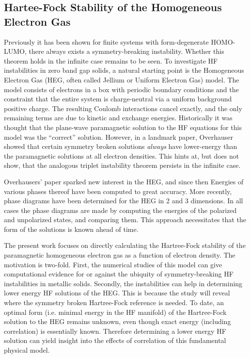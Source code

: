 \documentclass{revtex4}
\begin{document}
    \subsection{Hartee-Fock Stability of the Homogeneous Electron Gas}
    
    Previously it has been shown for finite systems with form-degenerate HOMO-LUMO, there always 
    exists a symmetry-breaking instability\cite{Yamada2015}. Whether this theorem holds in the 
    infinite case remains to be seen. To investigate HF instabilities in zero band gap solids, a 
    natural starting point is the Homogeneous Electron Gas (HEG, often called Jellium or Uniform 
    Electron Gas) model. The model consists of electrons in a box with periodic boundary conditions 
    and the constraint that the entire system is charge-neutral via a uniform background positive 
    charge. The resulting Coulomb interactions cancel exactly, and the only remaining terms are due 
    to kinetic and exchange energies. Historically it was thought that the 
    plane-wave paramagnetic solution to the HF equations for this model was the ``correct'' 
    solution. However, in a landmark paper, Overhauser showed that certain symmetry broken 
    solutions \emph{always} have lower-energy than the paramagnetic solutions at all electron 
    densities\cite{Overhauser1962}. This hints at, but does not show, that the analogous triplet 
    instability theorem persists in the infinite case.  
    
      Overhausers' paper sparked new interest in the HEG, and since then Energies of various 
      phases thereof 
      have been computed to great 
    accuracy\cite{Ceperley1980}. More 
    recently, phase diagrams have been determined for the 
    HEG in 2 and 3 dimensions\cite{Delyon2008, Bernu2011, Baguet2013}. In all cases the 
    phase diagrams are made by computing the energies of the polarized and unpolarized states, and 
    comparing them. This approach necessitates that the form of the solutions is known ahead of 
    time. 
    
    The present work focuses on directly calculating the Hartree-Fock stability of 
    the 
    paramagnetic homogeneous electron gas as a function of electron density. The motivation is 
    two-fold. First, the numerical studies of this model can give computational evidence for or 
    against the ubiquity of symmetry-breaking HF instabilities in metallic solids. Secondly, the 
    instabilities can help in determining lower energy HF solutions of the HEG. This is because the 
    study will reveal where the symmetry broken Hartree-Fock reference is needed. To date, an 
    optimal form (i.e. minimal energy in the HF manifold) of the Hartree-Fock solution to the HEG 
    remains unknown, even though exact energy 
    (including correlation) is essentially known. Therefore determining a lower energy HF solution 
    can yield insight into the effects of correlation of this fundamental physical model. 
    	
\end{document}
